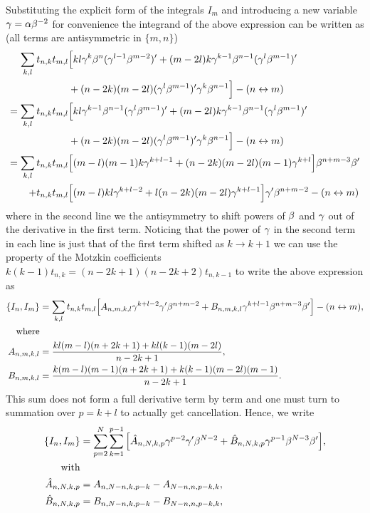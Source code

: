 \documentclass[12pt]{article}%
\numberwithin{equation}{section}
\begin{document}
Substituting the explicit form of the integrals $I_m$ and introducing a new variable $\gamma=\alpha \beta^{-2}$ for convenience the integrand of the above expression can be written as (all terms are antisymmetric in $\{m,n\}$)
\begin{equation}
\begin{aligned}
\sum_{k,l}t_{n,k}t_{m,l}&\Big[kl\gamma^k\beta^n(\gamma^{l-1}\beta^{m-2})'+(m-2l)k \gamma^{k-1}\beta^{n-1}(\gamma^l \beta^{m-1})'\\
&+(n-2k)(m-2l)(\gamma^l \beta^{m-1})'\gamma^k \beta^{n-1}\Big]-(n\leftrightarrow m)\\
=\sum_{k,l}t_{n,k}t_{m,l}&\Big[kl\gamma^{k-1}\beta^{n-1}(\gamma^l\beta^{m-1})'+(m-2l)k \gamma^{k-1}\beta^{n-1}(\gamma^l \beta^{m-1})'\\
&+(n-2k)(m-2l)(\gamma^l \beta^{m-1})'\gamma^k \beta^{n-1}\Big]-(n\leftrightarrow m)\\
=\sum_{k,l}t_{n,k}t_{m,l}&\Big[(m-l)(m-1)k \gamma^{k+l-1}+(n-2k)(m-2l)(m-1)\gamma^{k+l} \Big]\beta^{n+m-3}\beta'\\
+t_{n,k}t_{m,l}&\Big[(m-l)kl\gamma^{k+l-2}+l(n-2k)(m-2l)\gamma^{k+l-1}\Big]\gamma'\beta^{n+m-2}-(n\leftrightarrow m)
\end{aligned}
\end{equation}
where in the second line we the antisymmetry to shift  powers of $\beta$ and $\gamma$ out of the derivative in the first term. Noticing that the power of $\gamma$ in the second term in each line is just that of the first term shifted as $k \to k+1$ we can use the property of the Motzkin coefficients $k(k-1)t_{n,k}=(n-2k+1)(n-2k+2)t_{n,k-1}$ to write the above  expression as
\begin{equation}
\begin{aligned}
\{I_n,I_m\}&=\sum_{k,l}t_{n,k}t_{m,l}\Big[A_{n,m,k,l}\gamma^{k+l-2}\gamma'\beta^{n+m-2}+B_{n,m,k,l}\gamma^{k+l-1}\beta^{n+m-3}\beta'\Big]-(n\leftrightarrow m),\\
\mbox{where}&\\
A_{n,m,k,l}&=\frac{kl(m-l)(n+2k+1)+kl(k-1)(m-2l)}{n-2k+1},\\
B_{n,m,k,l}&=\frac{k(m-l)(m-1)(n+2k+1)+k(k-1)(m-2l)(m-1)}{n-2k+1}.
\end{aligned}
\end{equation} 
This sum does not form a full derivative term by term and one must turn to summation over $p=k+l$ to actually get cancellation. Hence, we write
\begin{equation}
\label{inv_last}
\begin{aligned}
\{I_n,I_m\}&=\sum_{p=2}^N\sum_{k=1}^{p-1}\Big[\hat{A}_{n,N,k,p}\gamma^{p-2}\gamma'\beta^{N-2}+\hat{B}_{n,N,k,p}\gamma^{p-1}\beta^{N-3}\beta'\Big],\\
\mbox{with}\\
\hat{A}_{n,N,k,p}&=A_{n,N-n,k,p-k}-A_{N-n,n,p-k,k},\\
\hat{B}_{n,N,k,p}&=B_{n,N-n,k,p-k}-B_{N-n,n,p-k,k},
\end{aligned}
\end{equation}
\end{document}
